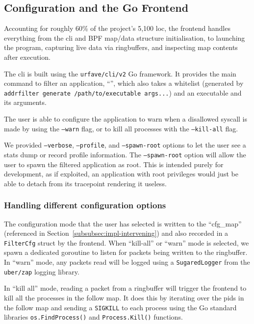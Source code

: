 \subsection{Configuration and the Go Frontend}\label{subsec:impl-frontend}

Accounting for roughly 60\% of the project's 5,100 \ac{loc}, the frontend handles 
everything from the \ac{cli} and BPF  map/data structure initialisation, to 
launching the program, capturing live data via ringbuffers, and inspecting 
map contents after execution. 


The \ac{cli} is built using the \texttt{urfave/cli/v2} Go framework. It provides
the main command to filter an application, ``\af'', which also takes a whitelist
(generated by \texttt{addrfilter generate /path/to/executable args...}) and an
executable and its arguments. 

The user is able to configure the application to warn when a disallowed syscall
is made by using the \texttt{--warn} flag, or to kill all processes with the
\texttt{--kill-all} flag. 

We provided \texttt{--verbose}, \texttt{--profile}, and \texttt{--spawn-root}
options to let the user see a stats dump or record profile information. The
\texttt{--spawn-root} option will allow the user to spawn the filtered
application as root. This is intended purely for development, as if exploited,
an application with root privileges would just be able to detach \af from its
tracepoint rendering it useless.


\subsubsection{Handling different configuration options}

The configuration mode that the user has selected is written to the
``cfg\_map'' (referenced in Section~\ref{subsubsec:impl-intervening}) and also
recorded in a \texttt{FilterCfg} struct by the frontend. When ``kill-all'' or
``warn'' mode is selected, we spawn a dedicated goroutine to listen for packets
being written to the ringbuffer. In ``warn'' mode, any packets read will be
logged using a \texttt{SugaredLogger} from the \texttt{uber/zap} logging
library. 

In ``kill all'' mode, reading a packet from a ringbuffer will trigger
the frontend to kill all the processes in the follow map. It does this by
iterating over the \acp{pid} in the follow map and sending a \texttt{SIGKILL} to
each process using the Go standard libraries \texttt{os.FindProcess()} and
\texttt{Process.Kill()} functions.

